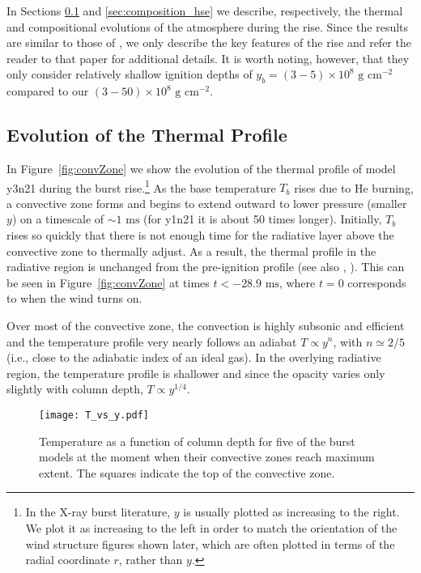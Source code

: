 \documentclass[apj,usenatbib, iop, twocolappendix]{emulateapj}
\newcommand{\trm}[1]{\textrm{#1}}
\begin{document}
In Sections \ref{sec:thermal_hse} and \ref{sec:composition_hse} we describe, respectively,  the thermal and compositional evolutions of the atmosphere during the rise.  Since the results are similar to those of , we only describe the key features of the rise and refer the reader to that paper for additional details.  It is worth noting, however, that they only consider relatively shallow ignition depths  of $y_b=(3-5)\times10^8\trm{ g cm}^{-2}$ compared to our $(3-50)\times10^8\trm{ g cm}^{-2}$.
 
\subsection{Evolution of the Thermal Profile}
\label{sec:thermal_hse}


In Figure~\ref{fig:convZone} we show the evolution of the thermal profile of model y3n21 during the burst rise.\footnote{In the X-ray burst literature, $y$ is usually plotted as increasing to the right.  We plot it as increasing to the left in order to match the orientation of the wind structure figures shown later, which are often plotted in terms of the radial coordinate $r$, rather than $y$.} As the base temperature $T_b$ rises due to He burning, a convective zone forms and begins to extend outward to lower pressure (smaller $y$) on a timescale of $\sim1 \trm{ ms}$ (for y1n21 it is about 50 times longer).   Initially, $T_b$ rises so quickly that there is not enough time for the radiative layer above the convective zone to thermally adjust.  As a result, the thermal profile in the radiative region is unchanged from the pre-ignition profile (see also , \citealt{Paxton:11}). This can be seen in Figure~\ref{fig:convZone} at times $t<-28.9\trm{ ms}$, where $t=0$ corresponds to when the wind turns on.  

Over most of the convective zone, the convection is highly subsonic and efficient  and the temperature profile very nearly follows an adiabat $T\propto y^n$, with $n\simeq 2/5$ (i.e., close to the adiabatic index of an ideal gas).  In the overlying radiative region, the temperature profile is shallower and since the opacity varies only slightly with column depth, $T\propto y^{1/4}$.


 \begin{figure}
\texttt{[image: T\_vs\_y.pdf]}
\caption{Temperature as a function of column depth for five  of the burst models at the moment when their convective zones reach maximum extent.  The squares indicate the top of the convective zone. }
\label{fig:T_vs_y}
\end{figure}
\end{document}

